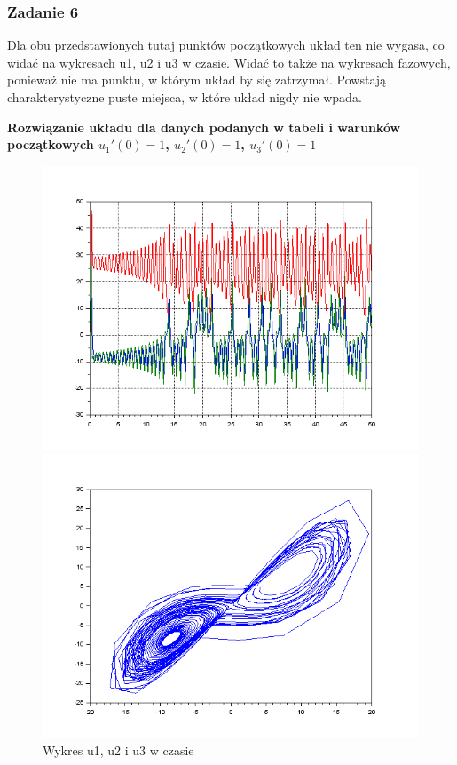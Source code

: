 \documentclass[12pt]{article}
\begin{document}
\subsubsection{Zadanie 6}

Dla obu przedstawionych tutaj punktów początkowych układ ten nie wygasa, co widać na wykresach u1, u2 i u3 w czasie. Widać to także na wykresach fazowych, ponieważ nie ma punktu, w którym układ by się zatrzymał. Powstają charakterystyczne puste miejsca, w które układ nigdy nie wpada.
\vspace{0.5cm}
\begin{center}
\textbf{Rozwiązanie układu dla danych podanych w tabeli i warunków początkowych $u_1'(0)=1$, $u_2'(0)=1$, $u_3'(0)=1$}
\end{center}

\begin{figure}[H]
  \centering
  \begin{minipage}[b]{0.49\textwidth}
    \includegraphics[scale=0.4]{./img/6-111-xy}
    \caption{Wykres u1, u2 i u3 w czasie}
    \end{minipage}
  \hfill
  \begin{minipage}[b]{0.49\textwidth}
    \includegraphics[scale=0.4]{./img/6-111-phase-1-2}

\end{minipage}
\end{figure}
\end{document}
